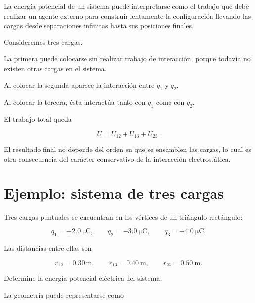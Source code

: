 La energía potencial de un sistema puede interpretarse como el trabajo que debe
realizar un agente externo para construir lentamente la configuración llevando las
cargas desde separaciones infinitas hasta sus posiciones finales.

Consideremos tres cargas.

La primera puede colocarse sin realizar trabajo de interacción, porque todavía no
existen otras cargas en el sistema.

Al colocar la segunda aparece la interacción entre \(q_1\) y \(q_2\).

Al colocar la tercera, ésta interactúa tanto con \(q_1\) como con \(q_2\).

El trabajo total queda

\[
U
=
U_{12}+U_{13}+U_{23}.
\]

El resultado final no depende del orden en que se ensamblen las cargas, lo cual es
otra consecuencia del carácter conservativo de la interacción electrostática.


\section{Ejemplo: sistema de tres cargas}

\begin{ejemplo}

Tres cargas puntuales se encuentran en los vértices de un triángulo rectángulo:

\[
q_1=+\SI{2.0}{\micro\coulomb},
\qquad
q_2=-\SI{3.0}{\micro\coulomb},
\qquad
q_3=+\SI{4.0}{\micro\coulomb}.
\]

Las distancias entre ellas son

\[
r_{12}=\SI{0.30}{\metre},
\qquad
r_{13}=\SI{0.40}{\metre},
\qquad
r_{23}=\SI{0.50}{\metre}.
\]

Determine la energía potencial eléctrica del sistema.

\end{ejemplo}

La geometría puede representarse como

\begin{center}
\end{center}

